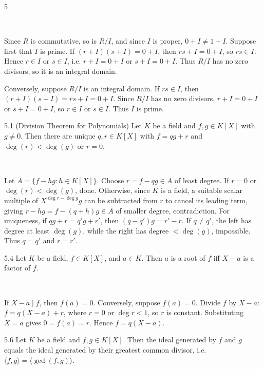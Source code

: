 \documentclass[8pt]{extarticle}
\makeatletter
\renewenvironment{proof}[1][\proofname]{%
  \pushQED{\qed}%
  \par\noindent\normalfont\itshape #1\@addpunct{.}\ \normalfont\ignorespaces
}{%
  \popQED%
  \par
}
\makeatother
\begin{document}
\begin{multicols*}{5}
        \begin{proof}
            Since \(R\) is commutative, so is \(R/I\), and since \(I\) is proper, \(0+I\ne1+I\). Suppose first that \(I\) is prime. If \((r+I)(s+I)=0+I\), then \(rs+I=0+I\), so \(rs\in I\). Hence \(r\in I\) or \(s\in I\), i.e. \(r+I=0+I\) or \(s+I=0+I\). Thus \(R/I\) has no zero divisors, so it is an integral domain.

            Conversely, suppose \(R/I\) is an integral domain. If \(rs\in I\), then \((r+I)(s+I)=rs+I=0+I\). Since \(R/I\) has no zero divisors, \(r+I=0+I\) or \(s+I=0+I\), so \(r\in I\) or \(s\in I\). Thus \(I\) is prime.
        \end{proof}

        \begin{theorem}{5.1}
            (Division Theorem for Polynomials) Let \(K\) be a field and \(f,g\in K[X]\) with \(g\ne0\). Then there are unique \(q,r\in K[X]\) with \(f=qg+r\) and \(\deg(r)<\deg(g)\) or \(r=0\).
        \end{theorem}

        \begin{proof}
            Let \(A=\{f-hg:h\in K[X]\}\). Choose \(r=f-qg\in A\) of least degree. If \(r=0\) or \(\deg(r)<\deg(g)\), done. Otherwise, since \(K\) is a field, a suitable scalar multiple of \(X^{\deg r-\deg g}g\) can be subtracted from \(r\) to cancel its leading term, giving \(r-hg=f-(q+h)g\in A\) of smaller degree, contradiction. For uniqueness, if \(qg+r=q'g+r'\), then \((q-q')g=r'-r\). If \(q\ne q'\), the left has degree at least \(\deg(g)\), while the right has degree \(<\deg(g)\), impossible. Thus \(q=q'\) and \(r=r'\).
        \end{proof}

        \begin{corollary}{5.4}
            Let \(K\) be a field, \(f\in K[X]\), and \(a\in K\). Then \(a\) is a root of \(f\) iff \(X-a\) is a factor of \(f\).
        \end{corollary}

        \begin{proof}
            If \(X-a\mid f\), then \(f(a)=0\). Conversely, suppose \(f(a)=0\). Divide \(f\) by \(X-a\): \(f=q(X-a)+r\), where \(r=0\) or \(\deg r<1\), so \(r\) is constant. Substituting \(X=a\) gives \(0=f(a)=r\). Hence \(f=q(X-a)\).
        \end{proof}

        \begin{corollary}{5.6}
            Let \(K\) be a field and \(f,g\in K[X]\). Then the ideal generated by \(f\) and \(g\) equals the ideal generated by their greatest common divisor, i.e. \(\langle f,g\rangle=\langle\gcd(f,g)\rangle\).
        \end{corollary}


\end{multicols*}
\end{document}
